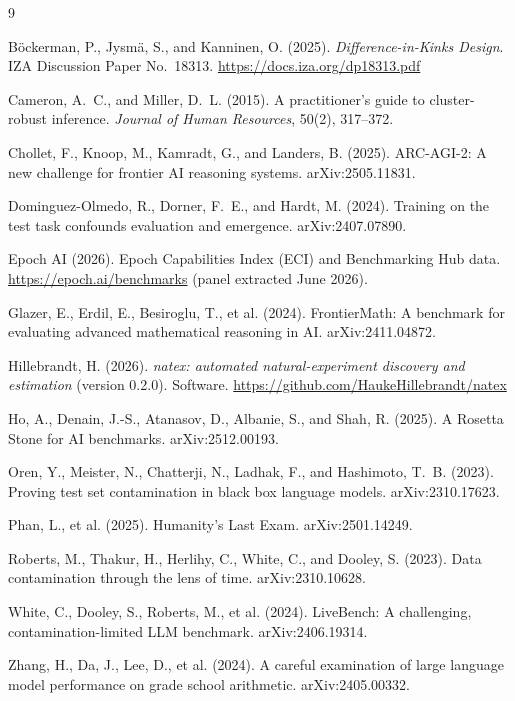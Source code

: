 \documentclass[11pt]{article}
\begin{document}
\footnotesize
\begin{thebibliography}{9}
\setlength{\itemsep}{1pt}\setlength{\parskip}{0pt}

B\"ockerman, P., Jysm\"a, S., and Kanninen, O. (2025).
\emph{Difference-in-Kinks Design}.
IZA Discussion Paper No.~18313.
\url{https://docs.iza.org/dp18313.pdf}

Cameron, A.~C., and Miller, D.~L. (2015).
A practitioner's guide to cluster-robust inference.
\emph{Journal of Human Resources}, 50(2), 317--372.

Chollet, F., Knoop, M., Kamradt, G., and Landers, B. (2025).
ARC-AGI-2: A new challenge for frontier AI reasoning systems.
arXiv:2505.11831.

Dominguez-Olmedo, R., Dorner, F.~E., and Hardt, M. (2024).
Training on the test task confounds evaluation and emergence.
arXiv:2407.07890.

Epoch AI (2026).
Epoch Capabilities Index (ECI) and Benchmarking Hub data.
\url{https://epoch.ai/benchmarks} (panel extracted June 2026).

Glazer, E., Erdil, E., Besiroglu, T., et al. (2024).
FrontierMath: A benchmark for evaluating advanced mathematical reasoning in
AI.
arXiv:2411.04872.

Hillebrandt, H. (2026).
\emph{natex: automated natural-experiment discovery and estimation} (version
0.2.0). Software.
\url{https://github.com/HaukeHillebrandt/natex}

Ho, A., Denain, J.-S., Atanasov, D., Albanie, S., and Shah, R. (2025).
A Rosetta Stone for AI benchmarks.
arXiv:2512.00193.

Oren, Y., Meister, N., Chatterji, N., Ladhak, F., and Hashimoto, T.~B.
(2023).
Proving test set contamination in black box language models.
arXiv:2310.17623.

Phan, L., et al. (2025).
Humanity's Last Exam.
arXiv:2501.14249.

Roberts, M., Thakur, H., Herlihy, C., White, C., and Dooley, S. (2023).
Data contamination through the lens of time.
arXiv:2310.10628.

White, C., Dooley, S., Roberts, M., et al. (2024).
LiveBench: A challenging, contamination-limited LLM benchmark.
arXiv:2406.19314.

Zhang, H., Da, J., Lee, D., et al. (2024).
A careful examination of large language model performance on grade school
arithmetic.
arXiv:2405.00332.

\end{thebibliography}
\end{document}
